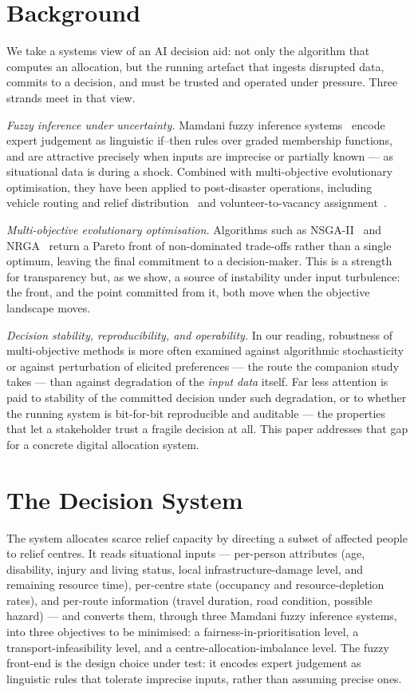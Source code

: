 \documentclass[systems,article,submit,moreauthors,pdftex]{Definitions/mdpi}
\begin{document}
\section{Background}\label{sec:background}

We take a systems view of an AI decision aid: not only the algorithm that computes an
allocation, but the running artefact that ingests disrupted data, commits to a decision, and
must be trusted and operated under pressure. Three strands meet in that view.

\emph{Fuzzy inference under uncertainty.} Mamdani fuzzy inference
systems~\cite{zadeh1965,mamdani1975} encode expert judgement as linguistic if--then rules over
graded membership functions, and are attractive precisely when inputs are imprecise or
partially known --- as situational data is during a shock. Combined with multi-objective evolutionary optimisation, they have been applied to
post-disaster operations, including vehicle routing and relief distribution~\cite{rabiei2021}
and volunteer-to-vacancy assignment~\cite{rabiei2023}.

\emph{Multi-objective evolutionary optimisation.} Algorithms such as NSGA-II~\cite{deb2002}
and NRGA~\cite{aljadaan2008} return a Pareto front of non-dominated trade-offs rather than a
single optimum, leaving the final commitment to a decision-maker. This is a strength for transparency but, as we show, a source
of instability under input turbulence: the front, and the point committed from it, both move
when the objective landscape moves.

\emph{Decision stability, reproducibility, and operability.} In our reading, robustness of
multi-objective methods is more often examined against algorithmic stochasticity or against
perturbation of elicited preferences --- the route the companion study~\cite{paperA2026}
takes --- than against degradation of the \emph{input data} itself. Far less
attention is paid to stability of the committed decision under such degradation, or to whether the running system is bit-for-bit reproducible and auditable ---
the properties that let a stakeholder trust a fragile decision at all. This paper addresses
that gap for a concrete digital allocation system.

\section{The Decision System}\label{sec:system}

The system allocates scarce relief capacity by directing a subset of affected people to
relief centres. It reads situational inputs --- per-person attributes (age, disability,
injury and living status, local infrastructure-damage level, and remaining resource time),
per-centre state (occupancy and resource-depletion rates), and per-route information (travel
duration, road condition, possible hazard) --- and converts them, through three Mamdani fuzzy
inference systems, into three objectives to be minimised: a fairness-in-prioritisation level,
a transport-infeasibility level, and a centre-allocation-imbalance level. The fuzzy front-end
is the design choice under test: it encodes expert judgement as linguistic rules that tolerate
imprecise inputs, rather than assuming precise ones.
\end{document}
